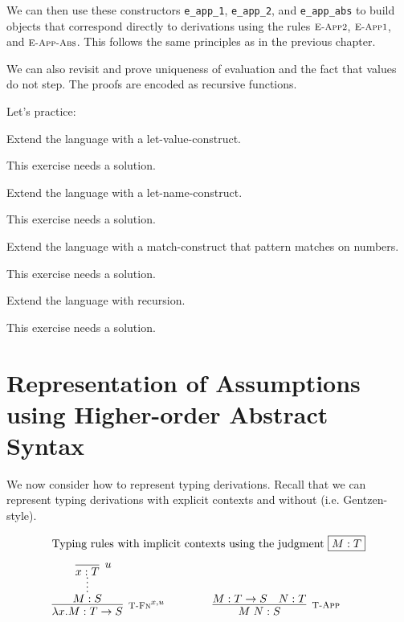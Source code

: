 We can then use these constructors \lstinline!e_app_1!,
\lstinline!e_app_2!, and \lstinline!e_app_abs! to build objects that
correspond directly to derivations using the rules $\textsc{\footnotesize E-App2}$,
$\textsc{\footnotesize E-App1}$, and  $\textsc{\footnotesize E-App-Abs}$. This follows the same principles as in the
previous chapter.

We can also revisit and prove uniqueness of evaluation and the fact that values
do not step. The proofs are encoded as recursive functions.

Let's practice:

\begin{Exercise}
Extend the language with a let-value-construct.
\end{Exercise}
\begin{Answer}
This exercise needs a solution.
\end{Answer}

\begin{Exercise}
Extend the language with a let-name-construct.
\end{Exercise}
\begin{Answer}
This exercise needs a solution.
\end{Answer}

\begin{Exercise}
Extend the language with a match-construct that pattern matches on numbers.
\end{Exercise}
\begin{Answer}
This exercise needs a solution.
\end{Answer}

\begin{Exercise}
Extend the language with recursion.
\end{Exercise}
\begin{Answer}
This exercise needs a solution.
\end{Answer}



\section{Representation of Assumptions using Higher-order Abstract Syntax}
We now consider how to represent typing derivations. Recall that we can
represent typing derivations with explicit contexts and without
(i.e. Gentzen-style).

\[
\begin{array}{c@{\qquad}c}
\multicolumn{2}{l}{\mbox{Typing rules with implicit contexts using the judgment \fbox{$M:T$}}} \\[1em]
\infer[\TFn^{x,u}]{\lam x.M : T \arrow S}
                 {\infer*{M:S}{\infer[u]{x:T}{}}} &
\infer[\TApp]{M\;N : S}{M : T \arrow S & N:T}
\end{array}
\]


